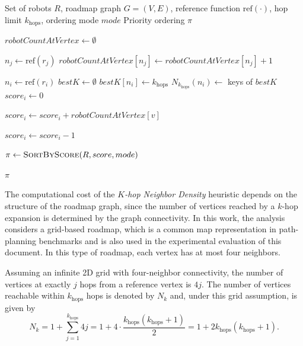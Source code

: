 \begin{algorithm}[H]
\caption{\(K\)-hop Neighbor Density Heuristic}
\label{alg:khop_density}
\footnotesize
{}
\begin{algorithmic}[1]
\Require Set of robots \(R\), roadmap graph \(G=(V,E)\), reference function \(\mathrm{ref}(\cdot)\), hop limit \(k_{\text{hops}}\), ordering mode \(mode\)
\Ensure Priority ordering \(\pi\)

\State \(robotCountAtVertex \gets \emptyset\)

    \State \(n_j \gets \mathrm{ref}(r_j)\) 
    \State \(robotCountAtVertex[n_j] \gets robotCountAtVertex[n_j] + 1\) 
\EndFor

    \State \(n_i \gets \mathrm{ref}(r_i)\) 
    \State \(bestK \gets \emptyset\)
    \State \(bestK[n_i] \gets k_{\text{hops}}\)
    \State {}
    \State \(N_{k_{\text{hops}}}(n_i) \gets\) keys of \(bestK\) 
    \State \(score_i \gets 0\)

        \State \(score_i \gets score_i + robotCountAtVertex[v]\) 
    \EndFor

    \State \(score_i \gets score_i - 1\) 
\EndFor

\State \(\pi \gets \textsc{SortByScore}(R, score, mode)\)

\State \Return \(\pi\)
\end{algorithmic}
\end{algorithm}

The computational cost of the \textit{$K$-hop Neighbor Density} heuristic depends on the structure of the roadmap graph, since the number of vertices reached by a $k$-hop expansion is determined by the graph connectivity. In this work, the analysis considers a grid-based roadmap, which is a common map representation in path-planning benchmarks and is also used in the experimental evaluation of this document. In this type of roadmap, each vertex has at most four neighbors.

Assuming an infinite 2D grid with four-neighbor connectivity, the number of vertices at exactly $j$ hops from a reference vertex is $4j$. The number of vertices reachable within $k_{\text{hops}}$ hops is denoted by $N_k$ and, under this grid assumption, is given by
\begin{equation}
    N_k =
    1 + \sum_{j=1}^{k_{\text{hops}}} 4j
    =
    1 + 4 \cdot \frac{k_{\text{hops}}(k_{\text{hops}}+1)}{2}
    =
    1 + 2k_{\text{hops}}(k_{\text{hops}}+1).
    \label{eq:khop_reachable_vertices}
\end{equation}

